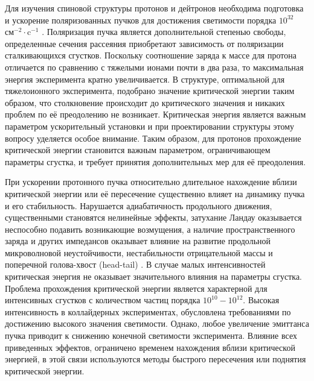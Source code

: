 \par	Для изучения спиновой структуры протонов и дейтронов необходима подготовка и ускорение поляризованных пучков для достижения светимости порядка $10^{32}$ $\text{см}^{-2}\cdot\text{c}^{-1}$ \cite{RHIC_luminosity}. Поляризация пучка является дополнительной степенью свободы, определенные сечения рассеяния приобретают зависимость от поляризации сталкивающихся сгустков. Поскольку соотношение заряда к массе для протона отличается по сравнению с тяжелыми ионами почти в два раза, то максимальная энергия эксперимента кратно увеличивается. В структуре, оптимальной для тяжелоионного эксперимента, подобрано значение критической энергии таким образом, что столкновение происходит до критического значения и никаких проблем по её преодолению не возникает. Критическая энергия является важным параметром ускорительный установки и при проектировании структуры этому вопросу уделяется особое внимание. Таким образом, для протонов прохождение критической энергии становится важным параметром, ограничивающем параметры сгустка, и требует принятия дополнительных мер для её преодоления.

\par	При ускорении протонного пучка относительно длительное нахождение вблизи критической энергии или её пересечение существенно влияет на динамику пучка и его стабильность. Нарушается адиабатичность продольного движения, существенными становятся нелинейные эффекты, затухание Ландау оказывается неспособно подавить возникающие возмущения, а наличие пространственного заряда и других импедансов оказывает влияние на развитие продольной микроволновой неустойчивости, нестабильности отрицательной массы и поперечной голова-хвост (head-tail) \cite{ng, lee}. В случае малых интенсивностей критическая энергия не оказывает значительного влияния на параметры сгустка. Проблема прохождения критической энергии является характерной для интенсивных сгустков с количеством частиц порядка $10^{10}-10^{12}$. Высокая интенсивность в коллайдерных экспериментах, обусловлена требованиями по достижению высокого значения светимости. Однако, любое увеличение эмиттанса пучка приводит к снижению конечной светимости эксперимента. Влияние всех приведенных эффектов, ограничено временем нахождения вблизи критической энергией, в этой связи используются методы быстрого пересечения или поднятия критической энергии.

